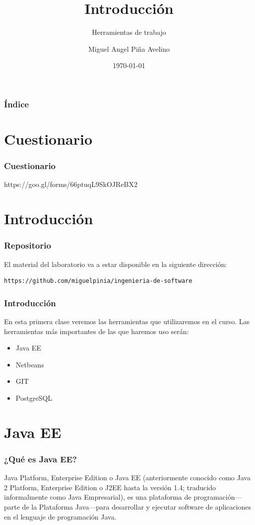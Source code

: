 \documentclass{beamer}
\title[Laboratorio]{Introducción}
\subtitle{Herramientas de trabajo}
\author[Miguel]{Miguel Angel Piña Avelino}
\institute[UNAM]{
  Facultad de Ciencias, UNAM
}
\date{\today}
\begin{document}
\frame{\titlepage}

\begin{frame}
  \frametitle{Índice}
  \tableofcontents
\end{frame}

\section{Cuestionario}

\begin{frame}
  \frametitle{Cuestionario}
  https://goo.gl/forms/66ptuqL9SkOJReBX2
\end{frame}

\section{Introducción}

\begin{frame}[fragile]
  \frametitle{Repositorio}
El material del laboratorio va a estar disponible en la siguiente
dirección:
\begin{verbatim}
https://github.com/miguelpinia/ingenieria-de-software
\end{verbatim}
\end{frame}

\begin{frame}
  \frametitle{Introducción}
  En esta primera clase veremos las herramientas que utilizaremos en el curso.
  Las herramientas más importantes de las que haremos uso serán:
  \begin{itemize}
    \item Java EE
    \item Netbeans
    \item GIT
    \item PostgreSQL
  \end{itemize}
\end{frame}
\section{Java EE}

\begin{frame}
  \frametitle{¿Qué es Java EE?}
  Java Platform, Enterprise Edition o Java EE (anteriormente conocido
  como Java 2 Platform, Enterprise Edition o J2EE hasta la versión
  1.4; traducido informalmente como Java Empresarial), es una
  plataforma de programación—parte de la Plataforma Java—para
  desarrollar y ejecutar software de aplicaciones en el lenguaje de
  programación Java.
\end{frame}
\end{document}
